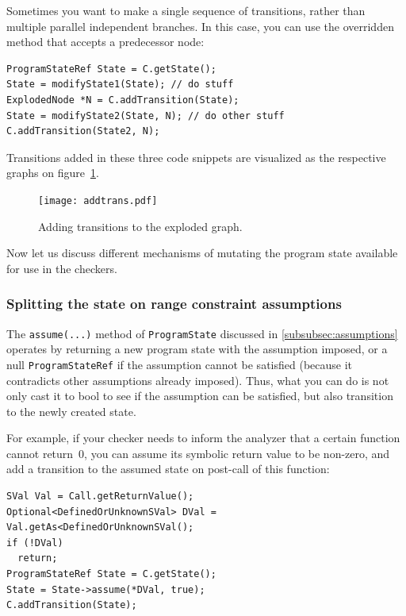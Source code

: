 \documentclass[a4paper,12pt]{article}
\newenvironment{nobr}{\begin{minipage}{\textwidth}\setlength\parskip{1em}
}{\end{minipage}\ignorespacesafterend}
\begin{document}
Sometimes you want to make a single sequence of transitions, rather than multiple parallel independent branches. In this case, you can use the overridden method that accepts a predecessor node:

\begin{lstlisting}[style=cplusplus,numbers=none]
ProgramStateRef State = C.getState();
State = modifyState1(State); // do stuff
ExplodedNode *N = C.addTransition(State);
State = modifyState2(State, N); // do other stuff
C.addTransition(State2, N);
\end{lstlisting}

Transitions added in these three code snippets are visualized as the respective graphs on figure~\ref{fig:addtrans}.

\begin{figure}[!ht]\center
\texttt{[image: addtrans.pdf]}
\caption{Adding transitions to the exploded graph.}
\label{fig:addtrans}
\end{figure}

Now let us discuss different mechanisms of mutating the program state available for use in the checkers.

\subsubsection{Splitting the state on range constraint assumptions}

The \lstinline|assume(...)| method of \lstinline|ProgramState| discussed in \ref{subsubsec:assumptions} operates by returning a new program state with the assumption imposed, or a null \lstinline|ProgramStateRef| if the assumption cannot be satisfied (because it contradicts other assumptions already imposed). Thus, what you can do is not only cast it to bool to see if the assumption can be satisfied, but also transition to the newly created state.

\begin{nobr}
For example, if your checker needs to inform the analyzer that a certain function cannot return~$0$, you can assume its symbolic return value to be non-zero, and add a transition to the assumed state on post-call of this function:

\begin{lstlisting}[style=cplusplus,numbers=none]
SVal Val = Call.getReturnValue();
Optional<DefinedOrUnknownSVal> DVal = Val.getAs<DefinedOrUnknownSVal();
if (!DVal)
  return;
ProgramStateRef State = C.getState();
State = State->assume(*DVal, true);
C.addTransition(State);
\end{lstlisting}
\end{nobr}
\end{document}
